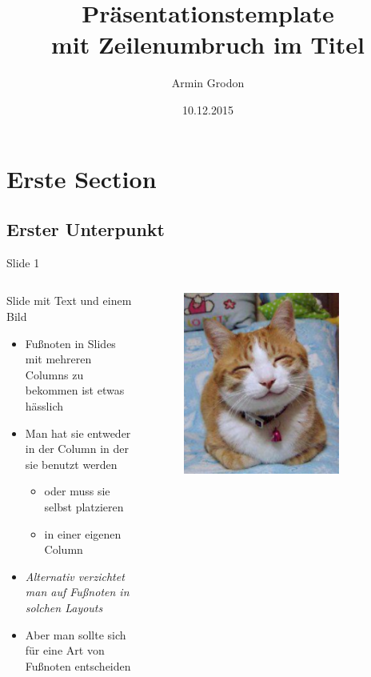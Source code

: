 \documentclass[t,compress,11pt,xcolor=dvipsnames]{beamer}
\author{Armin Grodon}
\date{10.12.2015}
\title{Präsentationstemplate\\ mit Zeilenumbruch im Titel}
\begin{document}
\maketitle



\section{Erste Section}
\label{sec-1}
\subsection{Erster Unterpunkt}
\label{sec-1-1}
\begin{frame}[label=sec-1-1-1]{Slide 1}
\begin{columns}
\begin{column}{0.6\textwidth}
Slide mit Text und einem Bild
\begin{itemize}
\item Fußnoten in Slides mit mehreren Columns zu bekommen
ist etwas hässlich\footnotemark[1]
\item Man hat sie entweder in der Column in der sie benutzt werden
\begin{itemize}
\item oder muss sie selbst platzieren
\item in einer eigenen Column
\end{itemize}
\item \emph{Alternativ verzichtet man auf Fußnoten in solchen Layouts}
\item Aber man sollte sich für eine Art von Fußnoten entscheiden
\end{itemize}
\end{column}
\begin{column}{0.4\textwidth}
\begin{figure}[htb]
\centering
\includegraphics[width=0.8\textwidth]{./img/cat.jpg}

\end{figure}
\end{column}
\end{columns}
\end{frame}
\end{document}
